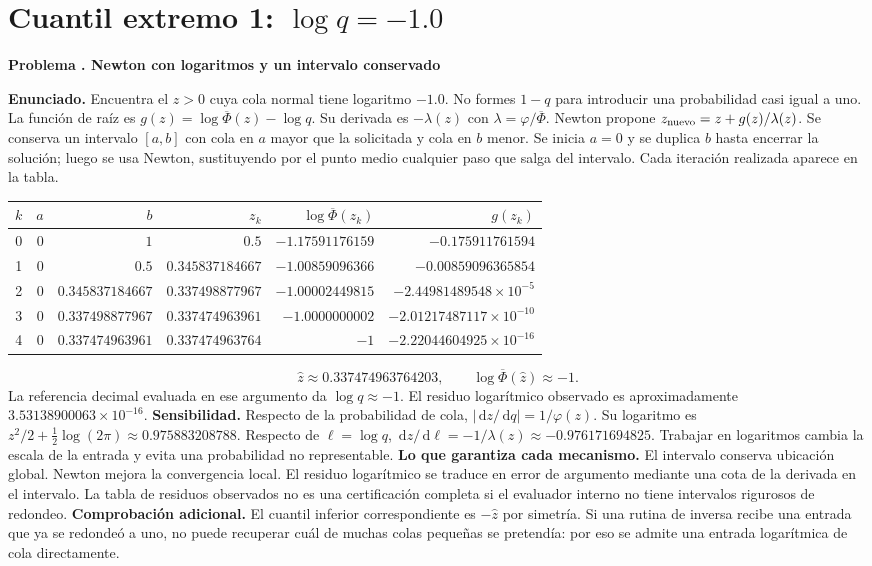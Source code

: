 \documentclass[11pt,a4paper]{article}
\newcommand{\dd}{\,\mathrm d}
\theoremstyle{definition}
\newcounter{problema}
\newenvironment{resuelto}[1]{\refstepcounter{problema}\par\medskip\Needspace{6\baselineskip}\textbf{Problema \theproblema. #1}\par}{\par\medskip}
\newcommand{\SF}{\overline\Phi}
\begin{document}
\section{\texorpdfstring{Cuantil extremo 1: $\log q=-1.0$}{Cuantil extremo 1: log q=-1.0}}
\begin{resuelto}{Newton con logaritmos y un intervalo conservado}
\textbf{Enunciado.} Encuentra el $z>0$ cuya cola normal tiene logaritmo $-1.0$. No formes $1-q$ para introducir una probabilidad casi igual a uno.
La función de raíz es $g(z)=\log\SF(z)-\log q$. Su derivada es $-\lambda(z)$ con $\lambda=\varphi/\SF$. Newton propone $z_{\rm nuevo}=z+g(z)/\lambda(z)$. Se conserva un intervalo $[a,b]$ con cola en $a$ mayor que la solicitada y cola en $b$ menor.
Se inicia $a=0$ y se duplica $b$ hasta encerrar la solución; luego se usa Newton, sustituyendo por el punto medio cualquier paso que salga del intervalo. Cada iteración realizada aparece en la tabla.

\begin{center}\small\begin{tabular}{rrrrrr}
\toprule
$k$&$a$&$b$&$z_k$&$\log\SF(z_k)$&$g(z_k)$\\
\midrule
0&$0$&$1$&$0.5$&$-1.17591176159$&$-0.175911761594$\\
1&$0$&$0.5$&$0.345837184667$&$-1.00859096366$&$-0.00859096365854$\\
2&$0$&$0.345837184667$&$0.337498877967$&$-1.00002449815$&$-2.44981489548\times10^{-5}$\\
3&$0$&$0.337498877967$&$0.337474963961$&$-1.0000000002$&$-2.01217487117\times10^{-10}$\\
4&$0$&$0.337474963961$&$0.337474963764$&$-1$&$-2.22044604925\times10^{-16}$\\
\bottomrule\end{tabular}\end{center}
\[
\widehat z\approx0.337474963764203,\qquad \log\SF(\widehat z)\approx-1.
\]
La referencia decimal evaluada en ese argumento da $\log q\approx-1$. El residuo logarítmico observado es aproximadamente $3.53138900063\times10^{-16}$.
\textbf{Sensibilidad.} Respecto de la probabilidad de cola, $|\dd z/\dd q|=1/\varphi(z)$. Su logaritmo es $z^2/2+\tfrac12\log(2\pi)\approx0.975883208788$. Respecto de $\ell=\log q$, $\dd z/\dd\ell=-1/\lambda(z)\approx-0.976171694825$. Trabajar en logaritmos cambia la escala de la entrada y evita una probabilidad no representable.
\textbf{Lo que garantiza cada mecanismo.} El intervalo conserva ubicación global. Newton mejora la convergencia local. El residuo logarítmico se traduce en error de argumento mediante una cota de la derivada en el intervalo. La tabla de residuos observados no es una certificación completa si el evaluador interno no tiene intervalos rigurosos de redondeo.
\textbf{Comprobación adicional.} El cuantil inferior correspondiente es $-\widehat z$ por simetría. Si una rutina de inversa recibe una entrada que ya se redondeó a uno, no puede recuperar cuál de muchas colas pequeñas se pretendía: por eso se admite una entrada logarítmica de cola directamente.
\end{resuelto}
\end{document}
